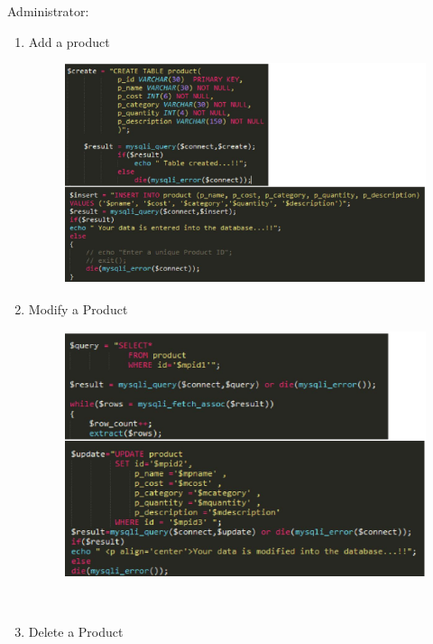 \documentclass{tcc}
\begin{document}
\newpage
\begin{flushleft}
\Large{{\selectfont
Administrator:
}}
\end{flushleft}

\begin{enumerate}
    \item Add a product
    \begin{figure}[H]
    \centering
    \includegraphics{images/2.PNG}\\
    \end{figure}
    \item Modify a Product
    \begin{figure}[H]
    \centering
    \includegraphics{images/3.PNG}\\
    \end{figure}
    \ \\
    \item Delete a Product
    \begin{figure}[H]

\end{figure}
\end{enumerate}
\end{document}
